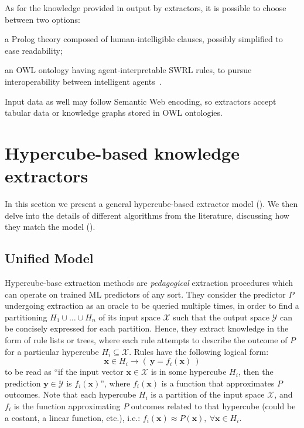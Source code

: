 \documentclass[
]{ceurart}
\begin{document}
As for the knowledge provided in output by extractors, it is possible to choose between two options:
\begin{inlinelist}
	\item a Prolog theory composed of human-intelligible clauses, possibly simplified to ease readability;
	\item an OWL ontology having agent-interpretable SWRL rules, to pursue interoperability between intelligent agents~\cite{psyke-extraamas2022}.
\end{inlinelist}
%
Input data as well may follow Semantic Web encoding, so \psyke{} extractors accept tabular data or knowledge graphs stored in OWL ontologies.

\section{Hypercube-based knowledge extractors}

In this section we present a general hypercube-based extractor model ().
%
We then delve into the details of different algorithms from the literature, discussing how they match the model ().

\subsection{Unified Model}

Hypercube-base extraction methods are \emph{pedagogical} extraction procedures which can operate on trained ML predictors of any sort.
%
They consider the predictor $P$ undergoing extraction as an oracle to be queried multiple times, in order to find a partitioning $H_1 \cup \ldots \cup H_n$ of its input space $\mathcal{X}$ such that the output space $\mathcal{Y}$ can be concisely %
expressed for each partition.
%
Hence, they extract knowledge in the form of rule lists or trees, where each rule attempts to describe the outcome of $P$ for a particular hypercube $H_i \subseteq \mathcal{X}$. 
%
Rules have the following logical form: 
%
\[ \mathbf{x} \in H_i \rightarrow (~\mathbf{y} = f_i(\mathbf{x})~) \]  
%
to be read as ``if the input vector $\mathbf{x} \in \mathcal{X}$ is in some hypercube $H_i$, then the prediction $\mathbf{y} \in \mathcal{Y}$ is $f_i(\mathbf{x})$'', where $f_i(\mathbf{x})$ is a function that approximates $P$ outcomes.
%
Note that each hypercube $H_i$ is a partition of the input space $\mathcal{X}$, and $f_i$ is the function approximating $P$ outcomes related to that hypercube (could be a costant, a linear function, etc.), i.e.: $f_i(\mathbf{x}) \approx P(\mathbf{x}),~\forall \mathbf{x} \in H_i$.
\end{document}
